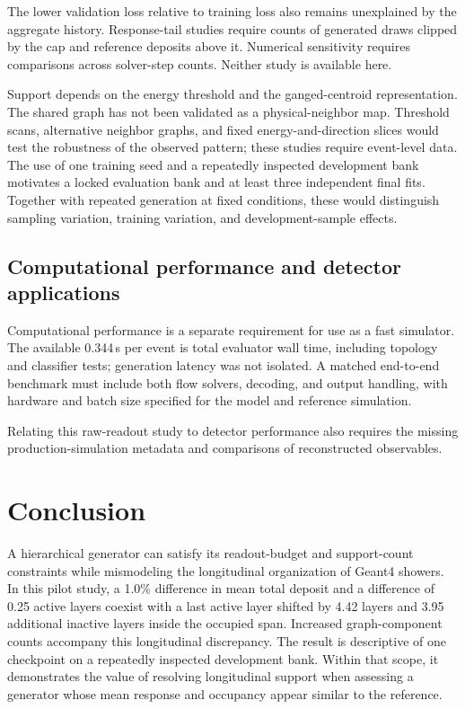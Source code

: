 \documentclass[11pt]{article}
\begin{document}
The lower validation loss relative to training loss also remains unexplained by the aggregate history. Response-tail studies require counts of generated draws clipped by the cap and reference deposits above it. Numerical sensitivity requires comparisons across solver-step counts. Neither study is available here.

Support depends on the energy threshold and the ganged-centroid representation. The shared graph has not been validated as a physical-neighbor map. Threshold scans, alternative neighbor graphs, and fixed energy-and-direction slices would test the robustness of the observed pattern; these studies require event-level data. The use of one training seed and a repeatedly inspected development bank motivates a locked evaluation bank and at least three independent final fits. Together with repeated generation at fixed conditions, these would distinguish sampling variation, training variation, and development-sample effects.

\subsection{Computational performance and detector applications}

Computational performance is a separate requirement for use as a fast simulator. The available 0.344\,s per event is total evaluator wall time, including topology and classifier tests; generation latency was not isolated. A matched end-to-end benchmark must include both flow solvers, decoding, and output handling, with hardware and batch size specified for the model and reference simulation.

Relating this raw-readout study to detector performance also requires the missing production-simulation metadata and comparisons of reconstructed observables.

\section{Conclusion}

A hierarchical generator can satisfy its readout-budget and support-count constraints while mismodeling the longitudinal organization of Geant4 showers. In this pilot study, a 1.0\% difference in mean total deposit and a difference of 0.25 active layers coexist with a last active layer shifted by 4.42 layers and 3.95 additional inactive layers inside the occupied span. Increased graph-component counts accompany this longitudinal discrepancy. The result is descriptive of one checkpoint on a repeatedly inspected development bank. Within that scope, it demonstrates the value of resolving longitudinal support when assessing a generator whose mean response and occupancy appear similar to the reference.
\end{document}
